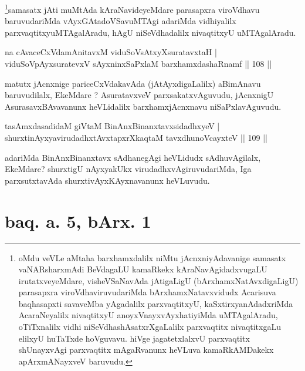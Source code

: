 \begin{artha}
\footnote{oMdu veVLe aMtaha barxhamxdalilx niMtu jAcnxniyAdavanige samasatx vaNARsharxmAdi BeVdagaLU kamaRkekx kAraNavAgidadxvugaLU irutatxveyeMdare, visheVSaNavAda jAtigaLigU (bArxhamxNatAvxdigaLigU) parasapxra viroVdhaviruvudariMda bArxhamxNatavxvidudx Acarisuva baqhasapxti savaveMba yAgadalilx parxvaqtitxyU, kaSxtirxyanAdadxriMda AcaraNeyalilx nivaqtitxyU anoyxVnayxvAyxhatiyiMda uMTAgalAradu, oTiTxnalilx vidhi niSeVdhashAsatxrXgaLalilx parxvaqtitx nivaqtitxgaLu elilxyU huTaTxde hoVguvavu. hiVge jagatetxlalxvU parxvaqtitx shUnayxvAgi parxvaqtitx mAgaRvanunx heVLuva kamaRkAMDakekx apArxmANayxveV baruvudu.}samasatx jAti muMtAda kAraNavideyeMdare parasapxra viroVdhavu baruvudariMda vAyxGAtadoVSavuMTAgi adariMda vidhiyalilx parxvaqtitxyuMTAgalAradu, hAgU niSeVdhadalilx nivaqtitxyU uMTAgalAradu.
\end{artha}


\begin{shl}
na cAvaceCxVdamAnitavxM viduSoV\s sAtxyXsuratavxtaH  | \\
viduSoV\s pAyxsuratevxV sAyxninxSaPxlaM barxhamxdashaRnamf \hfill||  108 ||  
\end{shl}

\begin{artha}
matutx jAcnxnige pariceCxVdakavAda (jAtAyxdigaLalilx) aBimAnavu baruvudilalx, EkeMdare ? AsuratavxveV parxsakatxvAguvudu, jAcnxnigU AsurasavxBAvavanunx heVLidalilx barxhamxjAcnxnavu niSaPxlavAguvudu.
\end{artha}


\begin{shl}
tasAmxdasadidaM giVtaM BinAnxBinanxtavxsidadhxyeV  | \\
shurxtinAyxyavirudadhxtAvxtapxrXkaqtaM tavxdhunoVcayxteV \hfill||  109 ||  
\end{shl}

\begin{artha}
adariMda BinAnxBinanxtavx sAdhanegAgi heVLidudx sAdhuvAgilalx, EkeMdare? shurxtigU nAyxyakUkx virudadhxvAgiruvudariMda, Iga parxsutxtavAda shurxtivAyxKAyxnavanunx heVLuvudu.
\end{artha}

\section*{baq. a. 5, bArx. 1}


